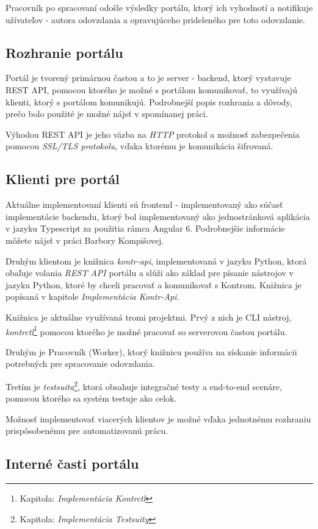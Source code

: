 \documentclass[
  digital, %
  twoside, %
  table,   %
  lof,     %
  lot,     %
]{fithesis3}
\begin{document}
Pracovník po spracovaní odošle výsledky portálu, ktorý ich vyhodnotí a notifikuje užívateľov - autora odovzdania a opravujúceho prideleného pre toto odovzdanie.

\subsection{Rozhranie portálu}

Portál je tvorený primárnou častou a to je server - backend, ktorý vystavuje REST API, pomocou ktorého je možné s portálom komunikovať, to využívajú klienti, ktorý s portálom komunikujú. Podrobnejší popis rozhrania a dôvody, prečo bolo použité je možné nájsť v spomínanej práci.

Výhodou REST API je jeho väzba na \emph{HTTP} protokol a možnosť zabezpečenia pomocou \emph{SSL/TLS protokolu}, vďaka ktorému je komunikácia šifrovaná.

\subsection{Klienti pre portál}
Aktuálne implementovaní klienti sú frontend - implementovaný ako súčasť implementácie backendu, ktorý bol implementovaný ako jednostránková aplikácia v jazyku Typescript za použitia rámca Angular 6. Podrobnejšie informácie môžete nájsť v práci Barbory Kompišovej.

Druhým klientom je knižnica \emph{kontr-api}, implementovaná v jazyku Python, ktorá obaľuje volania \emph{REST API} portálu a slúži ako základ pre písanie nástrojov v jazyku Python, ktoré by chceli pracovať a komunikovať s Kontrom. Knižnica je popísaná v kapitole \emph{Implementácia Kontr-Api}.

Knižnica je aktuálne využívaná tromi projektmi. Prvý z nich je CLI nástroj, \emph{kontrctl}\footnote{Kapitola: \emph{Implementácia Kontrctl}} pomocou ktorého je možné pracovať so serverovou častou portálu. 

Druhým je Pracovník (Worker), ktorý knižnicu používa na získanie informácii potrebných pre spracovanie odovzdania.

Tretím je \emph{testsuita}\footnote{Kapitola: \emph{Implementácia Testsuity}}, ktorá obsahuje integračné testy a end-to-end scenáre, pomocou ktorého sa systém testuje ako celok.

Možnosť implementovať viacerých klientov je možné vďaka jednotnému rozhraniu prispôsobenému pre automatizovanú prácu.

\subsection{Interné časti portálu}
\end{document}
